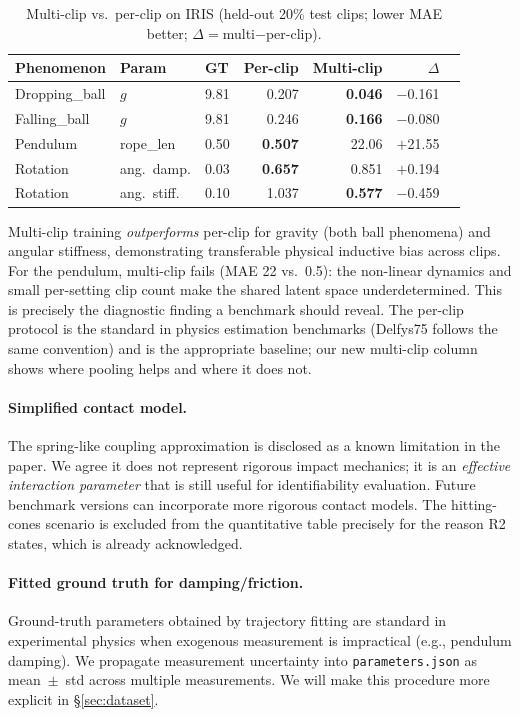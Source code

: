 \documentclass[10pt,twocolumn,letterpaper]{article}
\begin{document}
\begin{table}[h]
  \centering
  \caption{Multi-clip vs.\ per-clip on IRIS (held-out 20\% test clips; lower MAE better; $\Delta{=}$multi$-$per-clip).}
  \label{tab:multi_clip_iris}
  \small
  \setlength{\tabcolsep}{3pt}
  \begin{tabular}{@{}lllrrrr@{}}
    \toprule
    Phenomenon & Param & GT & Per-clip & Multi-clip & $\Delta$ \\
    \midrule
    Dropping\_ball & $g$ & 9.81 & 0.207 & \textbf{0.046} & $-$0.161 \\
    Falling\_ball  & $g$ & 9.81 & 0.246 & \textbf{0.166} & $-$0.080 \\
    Pendulum       & rope\_len & 0.50 & \textbf{0.507} & 22.06 & $+$21.55 \\
    Rotation       & ang.\ damp. & 0.03 & \textbf{0.657} & 0.851 & $+$0.194 \\
    Rotation       & ang.\ stiff. & 0.10 & 1.037 & \textbf{0.577} & $-$0.459 \\
    \bottomrule
  \end{tabular}
\end{table}

Multi-clip training \emph{outperforms} per-clip for gravity (both ball phenomena) and angular stiffness, demonstrating transferable physical inductive bias across clips. For the pendulum, multi-clip fails (MAE 22 vs.\ 0.5): the non-linear dynamics and small per-setting clip count make the shared latent space underdetermined. This is precisely the diagnostic finding a benchmark should reveal. The per-clip protocol is the standard in physics estimation benchmarks (Delfys75 follows the same convention) and is the appropriate baseline; our new multi-clip column shows where pooling helps and where it does not.

\paragraph{Simplified contact model.}
The spring-like coupling approximation is disclosed as a known limitation in the paper. We agree it does not represent rigorous impact mechanics; it is an \emph{effective interaction parameter} that is still useful for identifiability evaluation. Future benchmark versions can incorporate more rigorous contact models. The hitting-cones scenario is excluded from the quantitative table precisely for the reason R2 states, which is already acknowledged.

\paragraph{Fitted ground truth for damping/friction.}
Ground-truth parameters obtained by trajectory fitting are standard in experimental physics when exogenous measurement is impractical (e.g., pendulum damping). We propagate measurement uncertainty into \texttt{parameters.json} as mean~$\pm$~std across multiple measurements. We will make this procedure more explicit in \S\ref{sec:dataset}.
\end{document}
